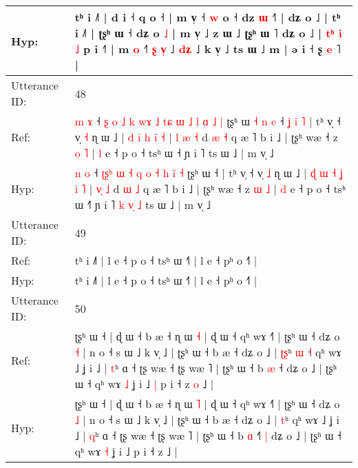 \documentclass[10pt]{article}
\DeclareRobustCommand{\hl}[1]{{\textcolor{red}{#1}}}
\begin{document}
\begin{longtable}{ll}
 \\
Hyp: & tʰ i ˩˥ | d i ˧ q o ˧ | m v̩ ˧ \hl{w} o ˧ dz \hl{ɯ} ˧˥ | dʑ o ˩ | tʰ i ˩˥ | ʈʂʰ ɯ ˧ dʑ o \hl{˩} | m v̩ ˩ z ɯ ˩ ʈʂʰ ɯ ˥ dʑ o ˩ | \hl{t}\hl{ʰ} \hl{i} \hl{˩} p i ˧˥ | m \hl{o} ˧\hl{}\hl{}\hl{}\hl{}\hl{}\hl{˥} \hl{ʂ} \hl{v}\hl{̩} ˩ \hl{}\hl{d}\hl{ʑ} ˩\hl{}\hl{}\hl{}\hl{}\hl{}\hl{}\hl{}\hl{} k v̩ ˩ ts ɯ ˩\hl{}\hl{} m\hl{}\hl{}\hl{}\hl{}\hl{} | ə\hl{}\hl{}\hl{}\hl{} i ˧ ʂ \hl{e} ˥\hl{}\hl{}\hl{}\hl{}\hl{}\hl{} |
 \\
\midrule
Utterance ID: & 48 \\
Ref: & \hl{m} \hl{ɤ} ˧\hl{ }\hl{ʂ}\hl{ }\hl{o} \hl{˩}\hl{ }\hl{k} \hl{w}\hl{ɤ} \hl{˩} \hl{t}\hl{ɕ} \hl{ɯ} \hl{˩} \hl{l} \hl{ɑ}\hl{ }\hl{˩} \hl{|} ʈʂʰ ɯ\hl{ }\hl{˧}\hl{ }\hl{n}\hl{ }\hl{e} ˧\hl{ }\hl{ʝ}\hl{ }\hl{i}\hl{ }\hl{˥} | tʰ v̩ ˧ v̩ \hl{˧} ɳ ɯ ˩ | \hl{d} \hl{i} \hl{h} \hl{}\hl{i}\hl{̃} \hl{˧} | \hl{l}\hl{ }\hl{æ} \hl{˧} d \hl{æ} \hl{˧} q æ ˥ b i ˩ | ʈʂʰ wæ ˧ z \hl{o} \hl{˥} | \hl{l} e ˧ p o ˧ tsʰ ɯ ˧\hl{} ɲ i ˥\hl{}\hl{}\hl{}\hl{}\hl{}\hl{}\hl{} ts ɯ ˩ | m v̩ ˩
 \\
Hyp: & \hl{n} \hl{o} ˧\hl{}\hl{}\hl{}\hl{} \hl{ʈ}\hl{ʂ}\hl{ʰ} \hl{}\hl{ɯ} \hl{˧} \hl{}\hl{q} \hl{o} \hl{˧} \hl{h} \hl{}\hl{i}\hl{̃} \hl{˧} ʈʂʰ ɯ\hl{}\hl{}\hl{}\hl{}\hl{}\hl{} ˧\hl{}\hl{}\hl{}\hl{}\hl{}\hl{} | tʰ v̩ ˧ v̩ \hl{˩} ɳ ɯ ˩ | \hl{ɖ} \hl{ɯ} \hl{˧} \hl{ʝ}\hl{ }\hl{i} \hl{˥} | \hl{}\hl{v}\hl{̩} \hl{˩} d \hl{ɯ} \hl{˩} q æ ˥ b i ˩ | ʈʂʰ wæ ˧ z \hl{ɯ} \hl{˩} | \hl{d} e ˧ p o ˧ tsʰ ɯ ˧\hl{˥} ɲ i ˥\hl{ }\hl{k}\hl{ }\hl{v}\hl{̩}\hl{ }\hl{˩} ts ɯ ˩ | m v̩ ˩
 \\
\midrule
Utterance ID: & 49 \\
Ref: & tʰ i ˩˥ | l e ˧ p o ˧ tsʰ ɯ ˧˥ | l e ˧ pʰ o ˧˥ |
 \\
Hyp: & tʰ i ˩˥ | l e ˧ p o ˧ tsʰ ɯ ˧˥ | l e ˧ pʰ o ˧˥ |
 \\
\midrule
Utterance ID: & 50 \\
Ref: & ʈʂʰ ɯ ˧ | ɖ ɯ ˧ b æ ˧ ɳ ɯ \hl{˧} | ɖ ɯ ˧ qʰ wɤ ˧˥ | ʈʂʰ ɯ ˧ dʑ o \hl{˧} | n o ˧ s ɯ ˩ k v̩ ˩ | ʈʂʰ ɯ ˧ b æ ˧ dʑ o ˩ | \hl{ʈ}\hl{ʂ}ʰ\hl{ }\hl{ɯ}\hl{ }\hl{˧} qʰ wɤ ˩ ʝ i ˩ | \hl{t}ʰ ɑ ˧ ʈʂ wæ ˧ ʈʂ wæ ˥ | ʈʂʰ ɯ ˧ b \hl{æ} ˧\hl{}\hl{}\hl{} dʑ o ˩ | ʈʂʰ ɯ ˧ qʰ wɤ \hl{˩} ʝ i ˩\hl{ }\hl{|} p i ˧ z\hl{ }\hl{o} ˩ |
 \\
Hyp: & ʈʂʰ ɯ ˧ | ɖ ɯ ˧ b æ ˧ ɳ ɯ \hl{˥} | ɖ ɯ ˧ qʰ wɤ ˧˥ | ʈʂʰ ɯ ˧ dʑ o \hl{˩} | n o ˧ s ɯ ˩ k v̩ ˩ | ʈʂʰ ɯ ˧ b æ ˧ dʑ o ˩ | \hl{}\hl{t}ʰ\hl{}\hl{}\hl{}\hl{} qʰ wɤ ˩ ʝ i ˩ | \hl{q}ʰ ɑ ˧ ʈʂ wæ ˧ ʈʂ wæ ˥ | ʈʂʰ ɯ ˧ b \hl{ɑ} ˧\hl{˥}\hl{ }\hl{|} dʑ o ˩ | ʈʂʰ ɯ ˧ qʰ wɤ \hl{˧} ʝ i ˩\hl{}\hl{} p i ˧ z\hl{}\hl{} ˩ |

\end{longtable}
\end{document}
